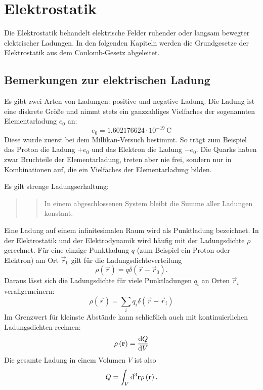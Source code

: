 \chapter{Elektrostatik\label{ref-014}}

Die Elektrostatik behandelt elektrische Felder ruhender oder langsam bewegter elektrischer Ladungen. In den folgenden Kapiteln werden die Grundgesetze der Elektrostatik aus dem Coulomb-Gesetz abgeleitet.

\section{Bemerkungen zur elektrischen Ladung\label{ref-015}}

Es gibt zwei Arten von Ladungen: positive und negative Ladung. Die Ladung ist eine diskrete Größe und nimmt stets ein ganzzahliges Vielfaches der sogenannten Elementarladung $e_{0}$ an:
\begin{equation*}
	e_{0}=1.602176624\cdot 10^{-19}\,\mathrm{C}
\end{equation*}
Diese wurde zuerst bei dem Millikan-Versuch bestimmt. So trägt zum Beispiel das Proton die Ladung $+e_{0}$ und das Elektron die Ladung $-e_{0}$. Die Quarks haben zwar Bruchteile der Elementarladung, treten aber nie frei, sondern nur in Kombinationen auf, die ein Vielfaches der Elementarladung bilden.

Es gilt strenge Ladungserhaltung:
\begin{quote}

	\begin{quote}
		In einem abgeschlossenen System bleibt die Summe aller Ladungen konstant.
	\end{quote}

\end{quote}
Eine Ladung auf einem infinitesimalen Raum wird als Punktladung bezeichnet. In der Elektrostatik und der Elektrodynamik wird häufig mit der Ladungsdichte $\rho $ gerechnet. Für eine einzige Punktladung $q$ (zum Beispiel ein Proton oder Elektron) am Ort $\vec {r}_{0}$ gilt für die Ladungsdichteverteilung
\begin{equation*}
	\rho \left(\vec {r}\right)=q\delta \left(\vec {r}-\vec {r}_{0}\right).
\end{equation*}
Daraus lässt sich die Ladungsdichte für viele Punktladungen $q_{i}$ an Orten $\vec {r}_{i}$ verallgemeinern:
\begin{equation*}
	\rho \left(\vec {r}\right)=\sum _{i}q_{i}\delta \left(\vec {r}-\vec {r}_{i}\right)
\end{equation*}
Im Grenzwert für kleinste Abstände kann schließlich auch mit kontinuierlichen Ladungsdichten rechnen:
\begin{equation*}
	\rho \left(\mathbf{r}\right)=\frac{\text{d} Q}{\text{d} V}
\end{equation*}
Die gesamte Ladung in einem Volumen $V$ ist also
\begin{equation*}
	Q=\int _{V}\text{d} ^{3}\mathbf{r}\rho \left(\mathbf{r}\right).
\end{equation*}
